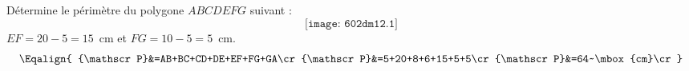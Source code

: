 Détermine le périmètre du polygone $ABCDEFG$ suivant :
\[\texttt{[image: 602dm12.1]}\]
$EF=20-5=15$~cm et $FG=10-5=5$~cm.
\[\Eqalign{
{\mathscr P}&=AB+BC+CD+DE+EF+FG+GA\cr
{\mathscr P}&=5+20+8+6+15+5+5\cr
{\mathscr P}&=64~\mbox{cm}\cr
}\]
